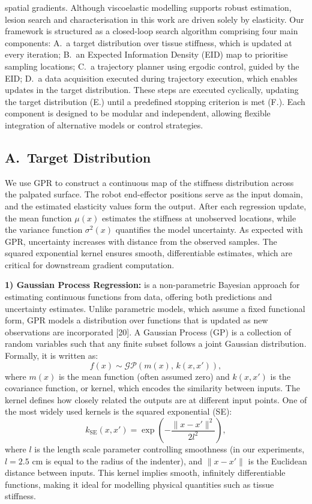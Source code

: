 \documentclass[11pt]{article}
\begin{document}
spatial gradients. Although viscoelastic modelling supports robust
estimation, lesion search and characterisation in this work are
driven solely by elasticity. Our framework is structured as a
closed-loop search algorithm comprising four main components:
A.~a target distribution over tissue stiffness, which is updated at
every iteration; B.~an Expected Information Density (EID) map to
prioritise sampling locations; C.~a trajectory planner using ergodic
control, guided by the EID; D.~a data acquisition executed during
trajectory execution, which enables updates in the target
distribution. These steps are executed cyclically, updating the
target distribution (E.) until a predefined stopping criterion is
met (F.). Each component is designed to be modular and independent,
allowing flexible integration of alternative models or control
strategies.

\subsection*{A.\ Target Distribution}

We use GPR to construct a continuous map of the stiffness
distribution across the palpated surface. The robot end-effector
positions serve as the input domain, and the estimated elasticity
values form the output. After each regression update, the mean
function $\mu(x)$ estimates the stiffness at unobserved locations,
while the variance function $\sigma^{2}(x)$ quantifies the model
uncertainty. As expected with GPR, uncertainty increases with
distance from the observed samples. The squared exponential kernel
ensures smooth, differentiable estimates, which are critical for
downstream gradient computation.

\textbf{1) Gaussian Process Regression:} is a non-parametric Bayesian
approach for estimating continuous functions from data, offering
both predictions and uncertainty estimates. Unlike parametric
models, which assume a fixed functional form, GPR models a
distribution over functions that is updated as new observations are
incorporated [20]. A Gaussian Process (GP) is a collection of random
variables such that any finite subset follows a joint Gaussian
distribution. Formally, it is written as:
\[
  f(x) \sim \mathcal{GP}(m(x),\, k(x, x')),
\]
where $m(x)$ is the mean function (often assumed zero) and
$k(x, x')$ is the covariance function, or kernel, which encodes the
similarity between inputs. The kernel defines how closely related
the outputs are at different input points. One of the most widely
used kernels is the squared exponential (SE):
\[
  k_{\mathrm{SE}}(x, x') =
  \exp\!\left(-\frac{\|x - x'\|^{2}}{2 l^{2}}\right),
\]
where $l$ is the length scale parameter controlling smoothness
(in our experiments, $l = 2.5$ cm is equal to the radius of the
indenter), and $\|x - x'\|$ is the Euclidean distance between
inputs. This kernel implies smooth, infinitely differentiable
functions, making it ideal for modelling physical quantities such
as tissue stiffness.
\end{document}
